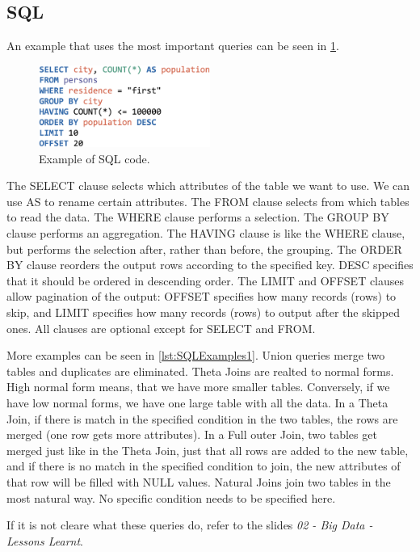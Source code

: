 \subsection{SQL}
An example that uses the most important queries can be seen in \cref{fig:SQLExmpl}.
\begin{figure}[H]
    \centering
    \includegraphics[width=0.5\textwidth]{Figures/ExampleSQL.png}
    \caption{Example of SQL code.}\label{fig:SQLExmpl}
\end{figure}
The SELECT clause selects which attributes of the table we want to use. We can use AS to rename certain attributes. The FROM clause selects from which tables to read the data. The WHERE clause performs a selection. The GROUP BY clause performs an aggregation. The HAVING clause is like the WHERE clause, but performs the selection after, rather than before, the grouping. The ORDER BY clause reorders the output rows according to the specified key. DESC specifies that it should be ordered in descending order. The LIMIT and OFFSET clauses allow pagination of the output: OFFSET specifies how many records (rows) to skip, and LIMIT specifies how many records (rows) to output after the skipped ones.
All clauses are optional except for SELECT and FROM.

More examples can be seen in \cref{lst:SQLExamples1}. Union queries merge two tables and duplicates are eliminated. Theta Joins are realted to normal forms. High normal form means, that we have more smaller tables. Conversely, if we have low normal forms, we have one large table with all the data. In a Theta Join, if there is match in the specified condition in the two tables, the rows are merged (one row gets more attributes). In a Full outer Join, two tables get merged just like in the Theta Join, just that all rows are added to the new table, and if there is no match in the specified condition to join, the new attributes of that row will be filled with NULL values. Natural Joins join two tables in the most natural way. No specific condition needs to be specified here.

If it is not cleare what these queries do, refer to the slides \textit{02 - Big Data - Lessons Learnt}.

